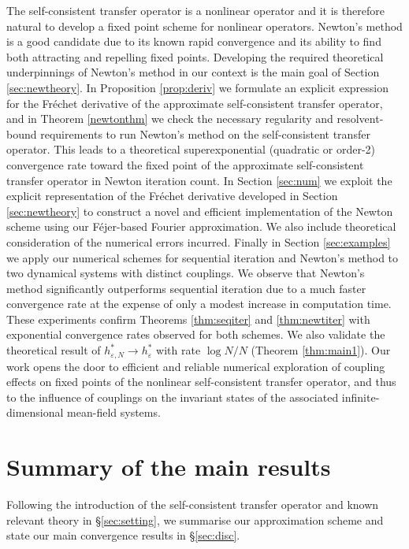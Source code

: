 \documentclass[12pt]{article}
\newcommand{\eps}{\varepsilon}
\theoremstyle{plain}
\begin{document}
 The self-consistent transfer operator is a nonlinear operator and it is therefore natural to develop a fixed point scheme for nonlinear operators.
 Newton's method is a good candidate due to its known rapid convergence and its ability to find both attracting and repelling fixed points. Developing the required theoretical underpinnings of Newton's method in our context is the main goal of Section \ref{sec:newtheory}. In Proposition \ref{prop:deriv} we formulate an explicit expression for the Fr\'echet derivative of the approximate self-consistent transfer operator, and in Theorem \ref{newtonthm} we check the necessary regularity and resolvent-bound requirements to run Newton's method \cite{bartle55, hinze2008optimization} on the self-consistent transfer operator. This leads to a theoretical superexponential (quadratic or order-2) convergence rate toward the fixed point of the approximate self-consistent transfer operator in Newton iteration
 count.
 In Section \ref{sec:num} we exploit the explicit representation of the Fr\'echet derivative developed in Section \ref{sec:newtheory} to construct a novel and efficient implementation of the Newton scheme using our F\'ejer-based Fourier approximation. We also include theoretical consideration of the numerical errors incurred. 
 Finally in Section \ref{sec:examples} we apply our numerical schemes for sequential iteration and Newton's method to two dynamical systems with distinct couplings. We observe that Newton's method significantly outperforms sequential iteration due to a much faster convergence rate at the expense of only a modest increase in computation time. 
 These experiments confirm  Theorems \ref{thm:seqiter} and \ref{thm:newtiter} with exponential convergence rates observed for both schemes.
We also validate the theoretical result of $h_{\eps,N}^*\to h_{\eps}^*$ with rate $\log N/N$ (Theorem \ref{thm:main1}).
Our work opens the door to efficient and reliable numerical exploration of coupling effects on 
 fixed points of the nonlinear self-consistent transfer operator,
and thus to the influence of couplings on the invariant states of the associated infinite-dimensional mean-field systems.

\label{sec:intro}
\section{Summary of the main results}\label{sec:mainresult}
Following the introduction of the self-consistent transfer operator and known relevant theory in \S\ref{sec:setting}, we summarise our approximation scheme and state our main convergence results in \S\ref{sec:disc}.
\end{document}
